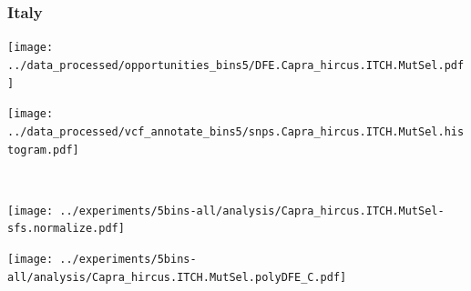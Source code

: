 \subsubsection{Italy}

\begin{minipage}{0.49\linewidth}
    \texttt{[image: ../data\_processed/opportunities\_bins5/DFE.Capra\_hircus.ITCH.MutSel.pdf]}
\end{minipage}
\begin{minipage}{0.49\linewidth}
    \texttt{[image: ../data\_processed/vcf\_annotate\_bins5/snps.Capra\_hircus.ITCH.MutSel.histogram.pdf]}
\end{minipage}
\\
\begin{minipage}{0.49\linewidth}
    \texttt{[image: ../experiments/5bins-all/analysis/Capra\_hircus.ITCH.MutSel-sfs.normalize.pdf]}
\end{minipage}
\begin{minipage}{0.4\linewidth}
    \texttt{[image: ../experiments/5bins-all/analysis/Capra\_hircus.ITCH.MutSel.polyDFE\_C.pdf]}
\end{minipage}
